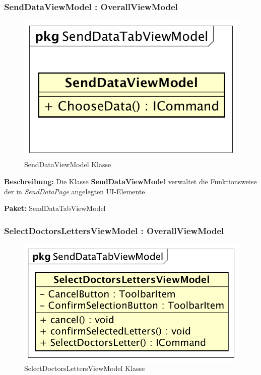 \documentclass[a4paper]{scrreprt}
\begin{document}
\subsubsection{SendDataViewModel : OverallViewModel}
\begin{figure}[H]
\centering
\includegraphics[width=0.45\textheight]{graphics/Klassendiagramme/ViewModel/SendDataViewModel.png}
\caption{SendDataViewModel Klasse}
\end{figure}

\textbf{Beschreibung:} Die Klasse \textbf{SendDataViewModel} verwaltet die Funktionsweise der in \textit{SendDataPage} angelegten UI-Elemente.

\textbf{Paket:} SendDataTabViewModel

\subsubsection{SelectDoctorsLettersViewModel : OverallViewModel}
\begin{figure}[H]
\centering
\includegraphics[width=0.45\textheight]{graphics/Klassendiagramme/ViewModel/SelectDoctorsLettersViewModel.png}
\caption{SelectDoctorsLettersViewModel Klasse}
\end{figure}
\end{document}
